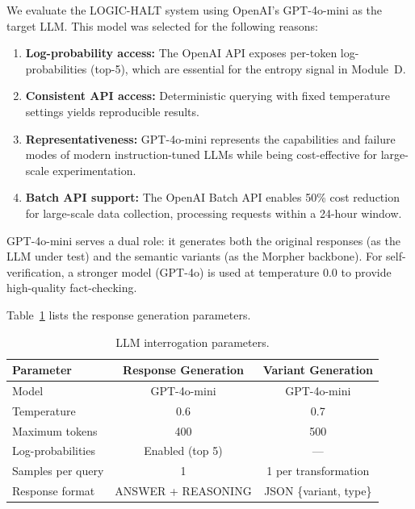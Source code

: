 We evaluate the LOGIC-HALT system using OpenAI's GPT-4o-mini as the target LLM. This model was selected for the following reasons:

\begin{enumerate}
    \item \textbf{Log-probability access:} The OpenAI API exposes per-token log-probabilities (top-5), which are essential for the entropy signal in Module~D.
    \item \textbf{Consistent API access:} Deterministic querying with fixed temperature settings yields reproducible results.
    \item \textbf{Representativeness:} GPT-4o-mini represents the capabilities and failure modes of modern instruction-tuned LLMs while being cost-effective for large-scale experimentation.
    \item \textbf{Batch API support:} The OpenAI Batch API enables 50\% cost reduction for large-scale data collection, processing requests within a 24-hour window.
\end{enumerate}

GPT-4o-mini serves a dual role: it generates both the original responses (as the LLM under test) and the semantic variants (as the Morpher backbone). For self-verification, a stronger model (GPT-4o) is used at temperature 0.0 to provide high-quality fact-checking.

Table~\ref{tab:interrogator-config} lists the response generation parameters.

\begin{table}[!htbp]
    \centering
    \caption{LLM interrogation parameters.}
    \label{tab:interrogator-config}
    \begin{tabular}{lcc}
        \toprule
        \textbf{Parameter} & \textbf{Response Generation} & \textbf{Variant Generation} \\
        \midrule
        Model                    & GPT-4o-mini & GPT-4o-mini \\
        Temperature              & 0.6         & 0.7         \\
        Maximum tokens           & 400         & 500         \\
        Log-probabilities        & Enabled (top 5) & --- \\
        Samples per query        & 1           & 1 per transformation \\
        Response format          & ANSWER + REASONING & JSON \{variant, type\} \\
        \bottomrule
    \end{tabular}
\end{table}

